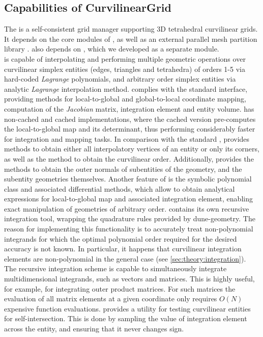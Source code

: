 \subsection{Capabilities of CurvilinearGrid}
\label{section-outline-capabilities}

The \curvgrid{} is a self-consistent grid manager supporting 3D tetrahedral curvilinear grids. It depends on the core modules of \dune{} \citeDune{}, as well as an external parallel mesh partition library \ParMETIS \citeParMetis{}. \curvgrid{} also depends on \curvgeom{}, which we developed as a separate \dune{} module. \\

\noindent
\curvgeom{} is capable of interpolating and performing multiple geometric operations over curvilinear simplex entities (edges, triangles and tetrahedra) of orders 1-5 via hard-coded \textit{Lagrange} polynomials, and arbitrary order simplex entities via analytic \textit{Lagrange} interpolation method. \curvgeom{} complies with the standard \dunegeom{} interface, providing methods for local-to-global and global-to-local coordinate mapping, computation of the \textit{Jacobian} matrix, integration element and entity volume. \curvgeom{} has non-cached and cached implementations, where the cached version pre-computes the local-to-global map and its determinant, thus performing considerably faster for integration and mapping tasks. In comparison with the standard \dunegeom{}, \curvgeom{} provides methods to obtain either all interpolatory vertices of an entity or only its corners, as well as the method to obtain the curvilinear order. Additionally, \curvgeom{} provides the methods to obtain the outer normals of subentities of the geometry, and the subentity geometries themselves. Another feature of \curvgeom{} is the symbolic polynomial class and associated differential methods, which allow to obtain analytical expressions for local-to-global map and associated integration element, enabling exact manipulation of geometries of arbitrary order. \curvgeom{} contains its own recursive integration tool, wrapping the quadrature rules provided by dune-geometry. The reason for implementing this functionality is to accurately treat non-polynomial integrands for which the optimal polynomial order required for the desired accuracy is not known. In particular, it happens that curvilinear integration elements are non-polynomial in the general case (see \cref{sec:theory:integration}). The recursive integration scheme is capable to simultaneously integrate multidimensional integrands, such as vectors and matrices. This is highly useful, for example, for integrating outer product matrices. For such matrices the evaluation of all matrix elements at a given coordinate only requires $O(N)$ expensive function evaluations. \curvgeom{} provides a utility for testing curvilinear entities for self-intersection. This is done by sampling the value of integration element across the entity, and ensuring that it never changes sign. \\

